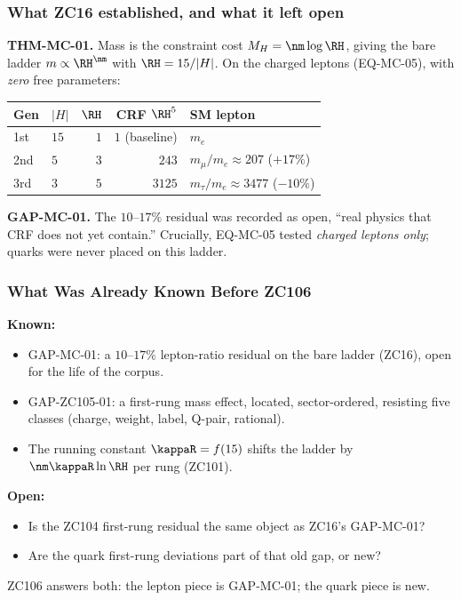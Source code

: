 \documentclass[12pt, a4paper]{article}
\begin{document}
\subsubsection{What ZC16 established, and what it left open}

\begin{keybox}[title={ZC16 (THM-MC-01) --- the pure-ladder lepton result}]
\textbf{THM-MC-01.} Mass is the constraint cost $M_H=\nm\log\RH$, giving the bare
ladder $m\propto\RH^{\nm}$ with $\RH=15/|H|$. On the charged leptons (EQ-MC-05),
with \emph{zero} free parameters:
\begin{center}
{\small\renewcommand{\arraystretch}{1.2}
\begin{tabular}{@{}llrrl@{}}
\toprule
Gen & $|H|$ & $\RH$ & CRF $\RH^{5}$ & SM lepton \\
\midrule
1st & $15$ & $1$ & $1$ (baseline) & $m_e$ \\
2nd & $5$  & $3$ & $243$          & $m_\mu/m_e\approx207$ \quad($+17\%$) \\
3rd & $3$  & $5$ & $3125$         & $m_\tau/m_e\approx3477$ \quad($-10\%$) \\
\bottomrule
\end{tabular}}
\end{center}

\textbf{GAP-MC-01.} The $10$--$17\%$ residual was recorded as open, ``real
physics that CRF does not yet contain.'' Crucially, EQ-MC-05 tested \emph{charged
leptons only}; quarks were never placed on this ladder.
\end{keybox}

\subsubsection{What Was Already Known Before ZC106}

\begin{keybox}[title={Pre-ZC106 Status}]
\textbf{Known:}
\begin{itemize}[leftmargin=2em, noitemsep]
  \item GAP-MC-01: a $10$--$17\%$ lepton-ratio residual on the bare ladder
    (ZC16), open for the life of the corpus.
  \item GAP-ZC105-01: a first-rung mass effect, located, sector-ordered,
    resisting five classes (charge, weight, label, Q-pair, rational).
  \item The running constant $\kappaR=f(15)$ shifts the ladder by
    $\nm\kappaR\ln\RH$ per rung (ZC101).
\end{itemize}

\textbf{Open:}
\begin{itemize}[leftmargin=2em, noitemsep]
  \item Is the ZC104 first-rung residual the same object as ZC16's GAP-MC-01?
  \item Are the quark first-rung deviations part of that old gap, or new?
\end{itemize}

ZC106 answers both: the lepton piece is GAP-MC-01; the quark piece is new.
\end{keybox}
\end{document}
